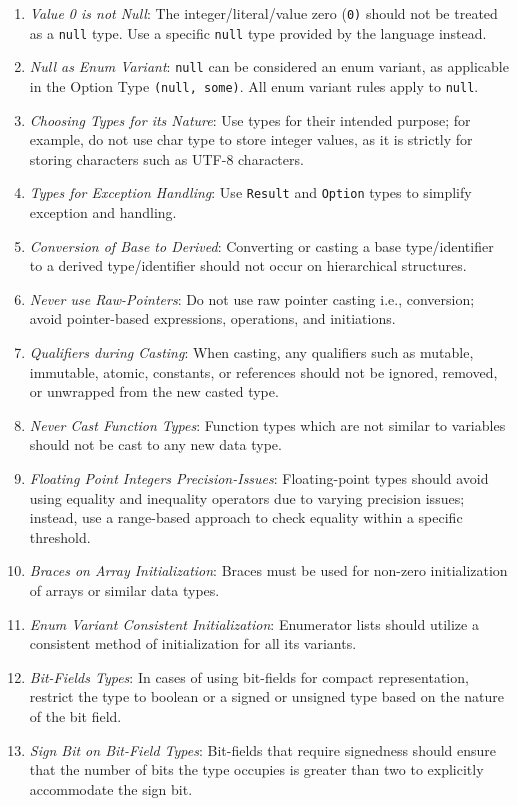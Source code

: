 \documentclass[9pt]{IEEEtran} %
\begin{document}
\begin{enumerate}
  \item \textit{Value 0 is not Null}: The integer/literal/value zero (\texttt{0)} should not be treated as a \texttt{null} type. Use a specific \texttt{null} type provided by the language instead.
  \item \textit{Null as Enum Variant}: \texttt{null} can be considered an enum variant, as applicable in the Option Type \texttt{(null, some)}. All enum variant rules apply to \texttt{null}.
  \item \textit{Choosing Types for its Nature}: Use types for their intended purpose; for example, do not use char type to store integer values, as it is strictly for storing characters such as UTF-8 characters.
  \item \textit{Types for Exception Handling}: Use \texttt{Result} and \texttt{Option} types to simplify exception and handling.
  \item \textit{Conversion of Base to Derived}: Converting or casting a base type/identifier to a derived type/identifier should not occur on hierarchical structures.
  \item \textit{Never use Raw-Pointers}: Do not use raw pointer casting i.e., conversion; avoid pointer-based expressions, operations, and initiations.
  \item \textit{Qualifiers during Casting}: When casting, any qualifiers such as mutable, immutable, atomic, constants, or references should not be ignored, removed, or unwrapped from the new casted type.
  \item \textit{Never Cast Function Types}: Function types which are not similar to variables should not be cast to any new data type.
  \item \textit{Floating Point Integers Precision-Issues}: Floating-point types should avoid using equality and inequality operators due to varying precision issues; instead, use a range-based approach to check equality within a specific threshold.
  \item \textit{Braces on Array Initialization}: Braces must be used for non-zero initialization of arrays or similar data types.
  \item \textit{Enum Variant Consistent Initialization}: Enumerator lists should utilize a consistent method of initialization for all its variants.
  \item \textit{Bit-Fields Types}: In cases of using bit-fields for compact representation, restrict the type to boolean or a signed or unsigned type based on the nature of the bit field.
  \item \textit{Sign Bit on Bit-Field Types}: Bit-fields that require signedness should ensure that the number of bits the type occupies is greater than two to explicitly accommodate the sign bit.

\end{enumerate}
\end{document}
